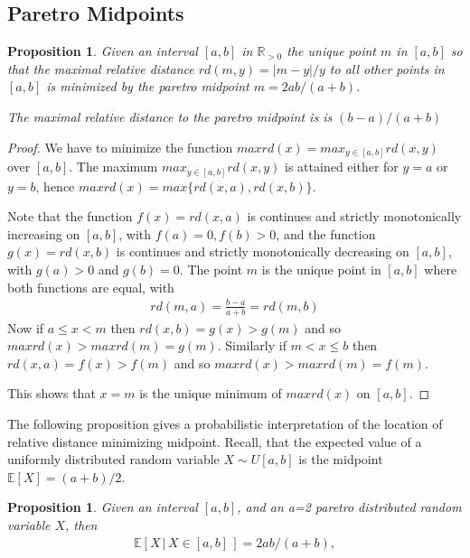 \documentclass{article}
\theoremstyle{plain}
\newtheorem{proposition}[definition]{Proposition}
\theoremstyle{remark}
\newcommand{\IE}{\mathbb{E}}
\newcommand{\IR}{\mathbb{R}}
\begin{document}
\subsection{Paretro Midpoints}

\begin{proposition} \label{prop:pdist}
  Given an interval $[a,b]$ in $\IR_{>0}$ the unique point $m$ in $[a,b]$ so that the maximal
  relative distance $rd(m, y) = |m-y|/y$ to all other points in $[a,b]$ is minimized
  by the paretro midpoint
  $m = 2ab / (a + b)$.

  The maximal relative distance to the paretro midpoint is is $(b - a) / (a + b)$
\end{proposition}

\begin{proof}
  We have to minimize the function $maxrd(x) = max_{y\in[a,b]} rd(x, y)$ over $[a,b]$.
  The maximum $max_{y\in[a,b]} rd(x, y)$ is attained either for $y = a$ or $y = b$,
  hence $maxrd(x) = max\{ rd(x,a), rd(x,b) \}$.

  Note that the function $f(x) = rd(x, a)$ is continues and strictly monotonically increasing on $[a,b]$, with $f(a) = 0, f(b) > 0$,
  and the function $g(x) = rd(x, b)$ is continues and strictly monotonically decreasing on $[a,b]$, with $g(a) > 0$ and $g(b) = 0$.
  The point $m$ is the unique point in $[a,b]$ where both functions are equal, with
  \begin{align*}
    rd(m, a) = \frac{b - a}{a + b} = rd(m, b)
  \end{align*}
  Now if $a \leq x < m$ then $rd(x, b) = g(x) > g(m)$ and so $maxrd(x) > maxrd(m) = g(m)$.
  Similarly if $m < x \leq b$ then $rd(x, a) = f(x) > f(m)$ and so $maxrd(x) > maxrd(m) = f(m)$.

  This shows that $x=m$ is the unique minimum of $maxrd(x)$ on $[a,b]$.
\end{proof}

The following proposition gives a probabilistic interpretation of the location of relative distance minimizing midpoint.
Recall, that the expected value of a uniformly distributed random variable $X \sim U[a,b]$ is the midpoint $\IE[X] = (a+b)/2$.

\begin{proposition}
  Given an interval $[a,b]$, and an a=2 paretro distributed random variable $X$, then
  \begin{align*}
    \IE[ X \, | \, X \in [a,b] \,] = 2ab / (a + b),
  \end{align*}
\end{proposition}
\end{document}
